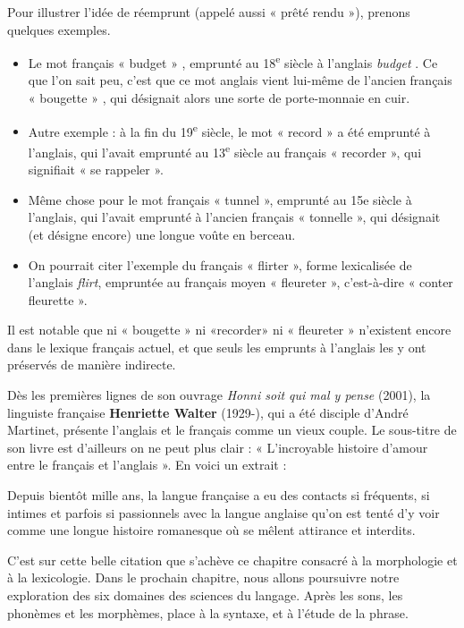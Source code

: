 Pour illustrer l’idée de réemprunt (appelé aussi « prêté rendu »), prenons quelques exemples.
\begin{itemize}
\item Le mot français « budget » \bipa{[bydʒɛ]}, emprunté au 18\textsuperscript{e} siècle à l’anglais \textit{budget} \bipa{[ˈbʌdʒɪt]}. Ce que l’on sait peu, c’est que ce mot anglais vient lui-même de l’ancien français « bougette » \bipa{[budʒetə/]}, qui désignait alors une sorte de porte-monnaie en cuir.
\item Autre exemple : à la fin du 19\textsuperscript{e} siècle, le mot « record » a été emprunté à l’anglais, qui l’avait emprunté au 13\textsuperscript{e} siècle au français « recorder », qui signifiait « se rappeler ».
\item Même chose pour le mot français « tunnel », emprunté au 15e siècle à l’anglais, qui l’avait emprunté à l’ancien français « tonnelle », qui désignait (et désigne encore) une longue voûte en berceau.
\item On pourrait citer l’exemple du français « flirter », forme lexicalisée de l’anglais \textit{flirt}, empruntée au français moyen « fleureter », c’est-à-dire « conter fleurette ».
\end{itemize}
Il est notable que ni « bougette » ni «recorder» ni « fleureter » n’existent encore dans le lexique français actuel, et que seuls les emprunts à l’anglais les y ont préservés de manière indirecte.

Dès les premières lignes de son ouvrage \textit{Honni soit qui mal y pense} (2001), la linguiste française \textbf{Henriette Walter} (1929-), qui a été disciple d’André Martinet, présente l’anglais et le français comme un vieux couple. Le sous-titre de son livre est d’ailleurs on ne peut plus clair : « L’incroyable histoire d’amour entre le français et l’anglais ». En voici un extrait :
\begin{lecture}{}
Depuis bientôt mille ans, la langue française a eu des contacts si fréquents, si intimes et parfois si passionnels avec la langue anglaise qu’on est tenté d’y voir comme une longue histoire romanesque où se mêlent attirance et interdits.
\end{lecture}
C’est sur cette belle citation que s’achève ce chapitre consacré à la morphologie et à la lexicologie. Dans le prochain chapitre, nous allons poursuivre notre exploration des six domaines des sciences du langage. Après les sons, les phonèmes et les morphèmes, place à la syntaxe, et à l’étude de la phrase.

